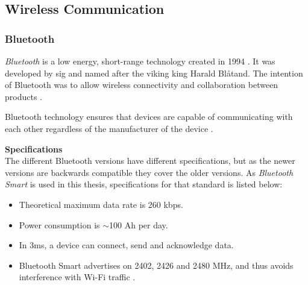 \subsection{Wireless Communication}
\subsubsection{Bluetooth}
\textit{Bluetooth} is a low energy, short-range technology created in 1994 \cite{ble2016}. It was developed by \acrshort{sig} and named after the viking king Harald Blåtand. The intention of Bluetooth was to allow wireless connectivity and collaboration between products \cite{bluetoothsig2016}.

Bluetooth technology ensures that devices are capable of communicating with each other regardless of the manufacturer of the device \cite{prabhu2004}.  

\textbf{Specifications}
\\
The different Bluetooth versions have different specifications, but as the newer versions are backwards compatible \cite{bluetoothreport2013} they cover the older versions. As \textit{Bluetooth Smart} is used in this thesis, specifications for that standard is listed below:

\begin{itemize}
    \item Theoretical maximum data rate is 260 kbps.
    \item Power consumption is $\sim$100 \micro Ah per day.
    \item In 3ms, a device can connect, send and acknowledge data.
    \item Bluetooth Smart advertises on 2402, 2426 and 2480 MHz, and thus avoids interference with Wi-Fi traffic \cite{csr2010}.
\end{itemize}